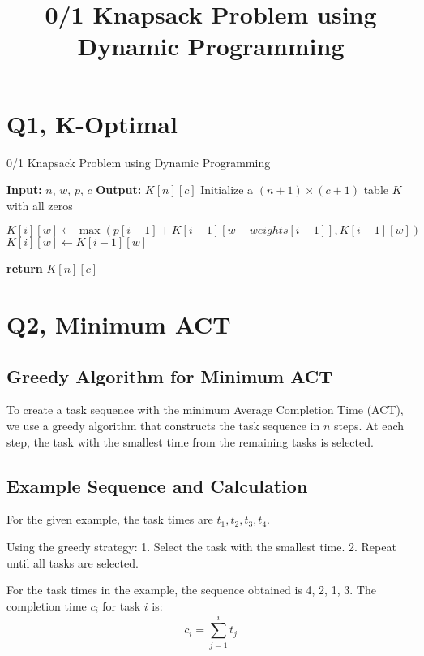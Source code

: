 \documentclass{article}
\begin{document}
\title{0/1 Knapsack Problem using Dynamic Programming}
\author{}
\date{}
\maketitle


\section{Q1, K-Optimal }

\begin{algorithm}
\caption{0/1 Knapsack Problem using Dynamic Programming}
\begin{algorithmic}[1]
\State \textbf{Input:} $n$, $w$, $p$, $c$
\State \textbf{Output:} $K[n][c]$
\State Initialize a $(n+1) \times (c+1)$ table $K$ with all zeros

            \State $K[i][w] \gets \max(p[i-1] + K[i-1][w-weights[i-1]], K[i-1][w])$
        \Else
            \State $K[i][w] \gets K[i-1][w]$
        \EndIf
    \EndFor
\EndFor

\State \textbf{return} $K[n][c]$
\end{algorithmic}
\end{algorithm}

\section{Q2, Minimum ACT}

\subsection*{Greedy Algorithm for Minimum ACT}
To create a task sequence with the minimum Average Completion Time (ACT), we use a greedy algorithm that constructs the task sequence in $n$ steps. At each step, the task with the smallest time from the remaining tasks is selected.

\subsection*{Example Sequence and Calculation}
For the given example, the task times are \( t_1, t_2, t_3, t_4 \).

Using the greedy strategy:
1. Select the task with the smallest time.
2. Repeat until all tasks are selected.

For the task times in the example, the sequence obtained is 4, 2, 1, 3. The completion time \( c_i \) for task \( i \) is:
\[
c_i = \sum_{j=1}^{i} t_j
\]
\end{document}
